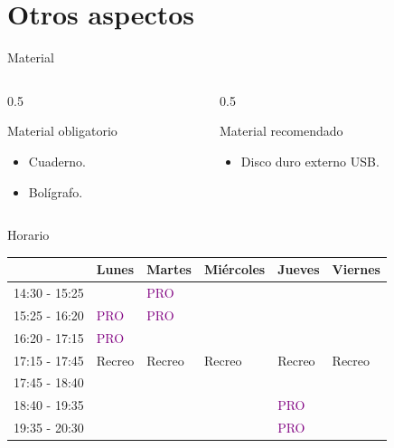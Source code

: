 \documentclass{beamer}
\begin{document}
\section{Otros aspectos}

\begin{frame}{Material}
    \begin{columns}
        \begin{column}[t]{0.5\textwidth}
            \begin{block}{Material obligatorio}
                \begin{itemize}
                    \item Cuaderno.
                    \item Bolígrafo.
                \end{itemize}
            \end{block}
        \end{column}
        \begin{column}[t]{0.5\textwidth}
            \begin{block}{Material recomendado}
                \begin{itemize}
                    \item Disco duro externo USB.
                \end{itemize}
            \end{block}
        \end{column}
    \end{columns}
\end{frame}

\begin{frame}{Horario}
    \begin{tabular}{|l|l|l|l|l|l|}
        \hline
         & Lunes & Martes & Miércoles & Jueves & Viernes\\
        \hline        
        14:30 - 15:25 & & \textcolor{purple}{PRO} & & &\\
        \hline
        15:25 - 16:20 & \textcolor{purple}{PRO} & \textcolor{purple}{PRO} & & &\\
        \hline
        16:20 - 17:15 & \textcolor{purple}{PRO} & & & &\\
        \hline
        17:15 - 17:45 & {\tiny Recreo} & {\tiny Recreo} & {\tiny Recreo} & {\tiny Recreo} & {\tiny Recreo}\\
        \hline
        17:45 - 18:40 & & & & &\\
        \hline
        18:40 - 19:35 & & & & \textcolor{purple}{PRO} &\\
        \hline
        19:35 - 20:30 & & & & \textcolor{purple}{PRO} &\\
        \hline
    \end{tabular}
\end{frame}
\end{document}
